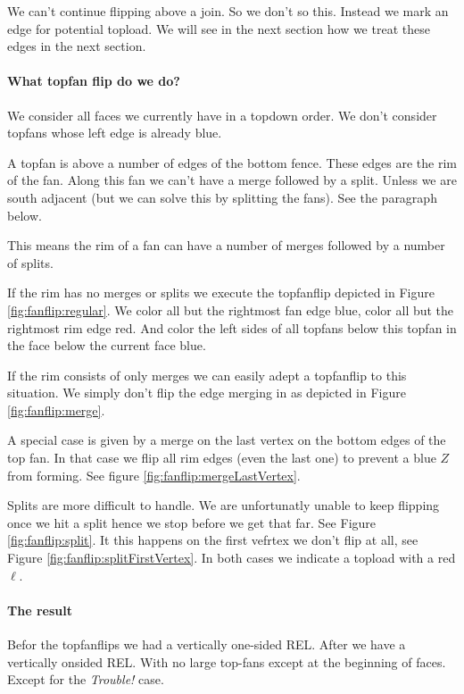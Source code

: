 We can't continue flipping above a join. So we don't so this. Instead we mark an edge for potential topload. We will see in the next section how we treat these edges in the next section.

\paragraph{What topfan flip do we do?}
We consider all faces we currently have in a topdown order. We don't consider topfans whose left edge is already blue. 

A topfan is above a number of edges of the bottom fence. These edges are the rim of the fan.  Along this fan we can't have a merge followed by a split. Unless we are south adjacent (but we can solve this by splitting the fans). See the paragraph below.

This means the rim of a fan can have a number of merges followed by a number of splits.

If the rim has no merges or splits we execute the topfanflip depicted in Figure \ref{fig:fanflip:regular}. We color all but the rightmost fan edge blue, color all but the rightmost rim edge red. And color the left sides of all topfans below this topfan in the face below the current face blue.

If the rim consists of only merges we can easily adept a topfanflip to this situation. We simply don't flip the edge merging in as depicted in Figure \ref{fig:fanflip:merge}.

A special case is given by a merge on the last vertex on the bottom edges of the top fan. In that case we flip all rim edges (even the last one) to prevent a blue $Z$ from forming. See figure \ref{fig:fanflip:mergeLastVertex}.

Splits are more difficult to handle. We are unfortunatly unable to keep flipping once we hit a split hence we stop before we get that far. See Figure \ref{fig:fanflip:split}. It this happens on the first vefrtex we don't flip at all, see Figure \ref{fig:fanflip:splitFirstVertex}. In both cases we indicate a topload with a red $\ell$.


\paragraph{The result}
Befor the topfanflips we had a vertically one-sided REL. After we have a vertically onsided REL. With no large top-fans except at the beginning of faces. Except for the \emph{Trouble!} case.

